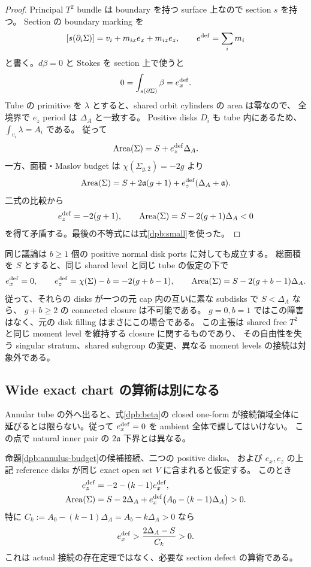\begin{proof}
Principal $T^2$ bundle は boundary を持つ surface 上なので section $s$ を持つ。
Section の boundary marking を
\[
 [s(\partial_i\Sigma)]=v_i+m_{ix}e_x+m_{iz}e_z,
 \qquad e^{\rm def}=\sum_i m_i
\]
と書く。$d\beta=0$ と Stokes を section 上で使うと
\[
 0=\int_{s(\partial\Sigma)}\beta=e_x^{\rm def}.
\]
Tube の primitive を $\lambda$ とすると、shared orbit cylinders の area は零なので、
全境界で $e_z$ period は $\Delta_A$ と一致する。
Positive disks $D_i$ も tube 内にあるため、$\int_{v_i}\lambda=A_i$ である。
従って
\begin{equation}\label{dpb:tube-stokes}
 \operatorname{Area}(\Sigma)=S+e_z^{\rm def}\Delta_A.
\end{equation}
一方、面積・Maslov budget は $\chi(\Sigma_{g,2})=-2g$ より
\[
 \operatorname{Area}(\Sigma)
 =S+2\mathfrak a(g+1)
   +e_z^{\rm def}(\Delta_A+\mathfrak a).
\]
二式の比較から
\[
 e_z^{\rm def}=-2(g+1),\qquad
 \operatorname{Area}(\Sigma)=S-2(g+1)\Delta_A<0
\]
を得て矛盾する。最後の不等式には式\eqref{dpb:small}を使った。
\end{proof}

同じ議論は $b\ge1$ 個の positive normal disk ports に対しても成立する。
総面積を $S$ とすると、同じ shared level と同じ tube の仮定の下で
\begin{equation}\label{dpb:general-tube}
 e_x^{\rm def}=0,\qquad
 e_z^{\rm def}=\chi(\Sigma)-b=-2(g+b-1),\qquad
 \operatorname{Area}(\Sigma)=S-2(g+b-1)\Delta_A.
\end{equation}
従って、それらの disks が一つの元 cap 内の互いに素な subdisks で $S<\Delta_A$ なら、
$g+b\ge2$ の connected closure は不可能である。
$g=0,b=1$ ではこの障害はなく、元の disk filling はまさにこの場合である。
この主張は shared free $T^2$ と同じ moment level を維持する closure に関するものであり、
その自由性を失う singular stratum、shared subgroup の変更、異なる moment levels の接続は対象外である。

\subsection{Wide exact chart の算術は別になる}

Annular tube の外へ出ると、式\eqref{dpb:beta}の closed one-form が接続領域全体に
延びるとは限らない。従って $e_x^{\rm def}=0$ を ambient 全体で課してはいけない。
この点で natural inner pair の $2\mathfrak a$ 下界とは異なる。

\begin{proposition}\label{dpb:wide}
命題\ref{dpb:annulus-budget}の候補接続、二つの positive disks、
および $e_x,e_z$ の上記 reference disks が同じ exact open set $V$ に含まれると仮定する。
このとき
\begin{align}
 e_z^{\rm def}&=-2-(k-1)e_x^{\rm def},\label{dpb:exact-defect}\\
 \operatorname{Area}(\Sigma)
 &=S-2\Delta_A
   +e_x^{\rm def}\bigl(A_0-(k-1)\Delta_A\bigr)>0.\label{dpb:exact-area}
\end{align}
特に $C_k:=A_0-(k-1)\Delta_A=A_b-k\Delta_A>0$ なら
\[
 e_x^{\rm def}>\frac{2\Delta_A-S}{C_k}>0.
\]
これは actual 接続の存在定理ではなく、必要な section defect の算術である。
\end{proposition}


